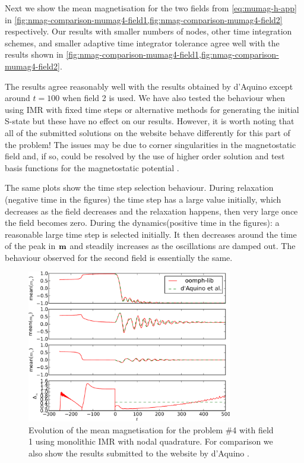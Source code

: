 Next we show the mean magnetisation for the two fields from \cref{eq:mumag-h-app} in \cref{fig:nmag-comparison-mumag4-field1,fig:nmag-comparison-mumag4-field2} respectively.
Our results with smaller numbers of nodes, other time integration schemes, and smaller adaptive time integrator tolerance agree well with the results shown in \cref{fig:nmag-comparison-mumag4-field1,fig:nmag-comparison-mumag4-field2}.

The results agree reasonably well with the results obtained by d'Aquino except around $t=100$ when field 2 is used.
We have also tested the behaviour when using IMR with fixed time steps or alternative methods for generating the initial S-state but these have no effect on our results.
However, it is worth noting that all of the submitted solutions on the \mumag website \cite{mumag-website} behave differently for this part of the problem!
The issues may be due to corner singularities in the magnetostatic field and, if so, could be resolved by the use of higher order solution and test basis functions for the magnetostatic potential \cite{Schrefl1997}.


The same plots show the time step selection behaviour.
During relaxation (negative time in the figures) the time step has a large value initially, which decreases as the field decreases and the relaxation happens, then very large once the field becomes zero.
During the dynamics(positive time in the figures): a reasonable large time step is selected initially.
It then decreases around the time of the peak in $\boldsymbol{\mathrm{m}}$ and steadily increases as the oscillations are damped out.
The behaviour observed for the second field is essentially the same.

\begin{figure}
  \centering
  \includegraphics[width=0.8\textwidth]{plots/mumag4_convergence/mumag4_field1-meanmxsvs-meanmysvs-meanmzsvs-dtsvstimes.pdf}
  \caption{
    Evolution of the mean magnetisation for the \mumag problem \#4 with field 1 using monolithic IMR with nodal quadrature.
    For comparison we also show the results submitted to the \mumag website by d'Aquino \etal \cite{mumag-website}.
}
  \label{fig:nmag-comparison-mumag4-field1}
\end{figure}


